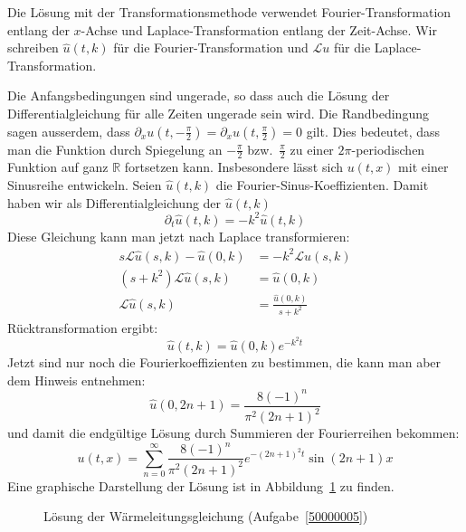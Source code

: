 \begin{loesung}
Die Lösung mit der Transformationsmethode
verwendet Fourier-Transformation
entlang der $x$-Achse und Laplace-Transformation entlang der Zeit-Achse.
Wir schreiben $\hat u(t,k)$ für die Fourier-Transformation und $\mathscr{L} u$
für die Laplace-Transformation.

Die Anfangsbedingungen sind ungerade, so dass auch die Lösung der
Differentialgleichung für alle Zeiten ungerade sein wird. Die
Randbedingung sagen ausserdem, dass
$\partial_xu(t,-\frac{\pi}2)=\partial_xu(t,\frac{\pi}2)=0$ gilt.
Dies bedeutet, dass man die Funktion durch Spiegelung an
$-\frac{\pi}2$ bzw.~$\frac{\pi}2$ zu einer $2\pi$-periodischen
Funktion auf ganz $\mathbb R$ fortsetzen kann. Insbesondere lässt
sich $u(t,x)$ mit einer Sinusreihe entwickeln. Seien $\hat u(t,k)$
die Fourier-Sinus-Koeffizienten. Damit haben wir als Differentialgleichung
der $\hat u(t,k)$
\[
\partial_t\hat u(t,k)=-k^2\hat u(t,k)
\]
Diese Gleichung kann man jetzt nach Laplace transformieren:
\begin{align*}
s\mathscr{L}\hat u(s,k) - \hat u(0,k)&=-k^2 \mathscr{L}\hat u(s,k)\\
(s+k^2)\mathscr{L}\hat u(s,k)&=\hat u(0,k)\\
\mathscr{L}\hat u(s,k)&=\frac{\hat u(0,k)}{s+k^2}
\end{align*}
Rücktransformation ergibt:
\[
\hat u(t,k)=\hat u(0,k) e^{-k^2t}
\]
Jetzt sind nur noch die Fourierkoeffizienten zu bestimmen, die kann
man aber dem Hinweis entnehmen:
\[
\hat u(0,2n+1)=
\frac{8(-1)^n}{\pi^2(2n+1)^2}
\]
und damit die endgültige Lösung durch Summieren der Fourierreihen bekommen:
\[
u(t,x)=
\sum_{n=0}^\infty \frac{8(-1)^n}{\pi^2(2n+1)^2}e^{-(2n+1)^2t}\sin(2n+1)x
\]
Eine graphische Darstellung der Lösung ist in Abbildung~\ref{50000005:bild}
zu finden.
\begin{figure}
\begin{center}
\end{center}
\caption{Lösung der Wärmeleitungsgleichung (Aufgabe~\ref{50000005})
\label{50000005:bild}}
\end{figure}
\end{loesung}
